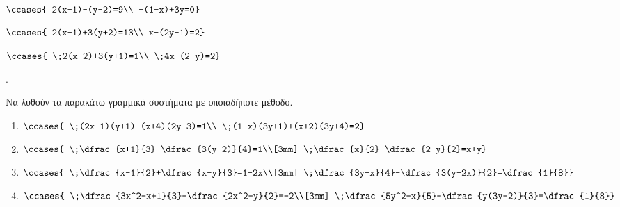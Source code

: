 \documentclass[11pt,a4paper,twocolumn]{article}
\newcounter{askhsh}
\newcommand{\askhsh}{\large\theaskhsh.\ \addtocounter{askhsh}{1}}
\begin{document}
\begin{alist}[leftmargin=3mm]
\item $ \ccases{
2(x-1)-(y-2)=9\\
-(1-x)+3y=0} $
\item $ \ccases{
2(x-1)+3(y+2)=13\\
x-(2y-1)=2} $
\item $\ccases{
\;2(x-2)+3(y+1)=1\\
\;4x-(2-y)=2}$
\end{alist}
\askhsh Να λυθούν τα παρακάτω γραμμικά συστήματα με οποιαδήποτε μέθοδο.
\begin{enumerate}[label=\roman*.,itemsep=3mm]
\item $\ccases{
\;(2x-1)(y+1)-(x+4)(2y-3)=1\\
\;(1-x)(3y+1)+(x+2)(3y+4)=2}$
\item $\ccases{
\;\dfrac{x+1}{3}-\dfrac{3(y-2)}{4}=1\\[3mm]
\;\dfrac{x}{2}-\dfrac{2-y}{2}=x+y}$
\item $\ccases{
\;\dfrac{x-1}{2}+\dfrac{x-y}{3}=1-2x\\[3mm]
\;\dfrac{3y-x}{4}-\dfrac{3(y-2x)}{2}=\dfrac{1}{8}}$
\item $\ccases{
\;\dfrac{3x^2-x+1}{3}-\dfrac{2x^2-y}{2}=-2\\[3mm]
\;\dfrac{5y^2-x}{5}-\dfrac{y(3y-2)}{3}=\dfrac{1}{8}}$
\end{enumerate}
\end{document}
